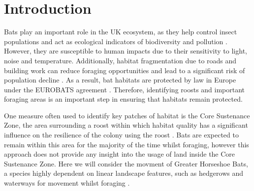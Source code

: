 \chapter{Introduction} \label{chap:intro}

  Bats play an important role in the UK ecosystem, as they help control insect
  populations \cite{Kunz2011} and act as ecological indicators of biodiversity and pollution \cite{Jones2009}.  However, they are susceptible to human impacts due to their sensitivity to
  light, noise and temperature. Additionally, habitat fragmentation due to roads
  and building work can reduce foraging opportunities and lead to a significant
  risk of population decline \cite{rossiter2000genetic}.
 As a result, bat habitats are protected by law in
Europe under the EUROBATS agreement \cite{Eurobats}. Therefore, identifying
roosts and important foraging areas is an important step in ensuring that
habitats remain protected.

One measure often used to identify key patches of
habitat is the Core Sustenance Zone, the area surrounding a roost within which
habitat quality has a significant influence on the resilience of the colony
using the roost \cite{CSZ}. Bats are expected to remain within this area for
the majority of the time whilst foraging, however this approach does not provide
any insight into the usage of land inside the Core Sustenance Zone. Here we will consider the movment of Greater Horseshoe Bats, a species highly dependent on linear
landscape features, such as hedgerows and waterways for movement whilst foraging \cite{froidevaux2017factors, duverge1994greater}.

